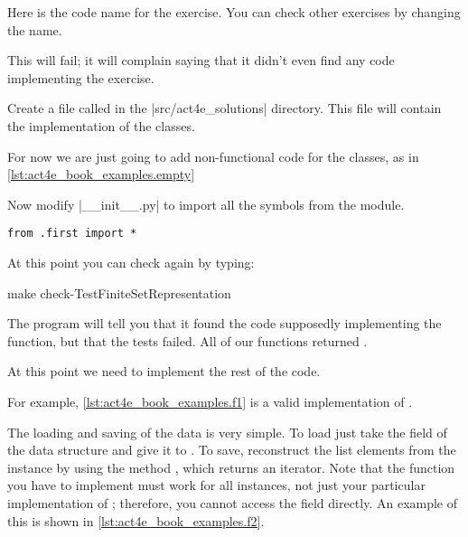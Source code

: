 Here  is the code name for the exercise. You can check other exercises by changing the name.

This will fail; it will complain saying that it didn't even find any code implementing the exercise.


Create a file called  in the \files|src/act4e_solutions| directory.
This file will contain the implementation of the classes.

For now we are just going to add non-functional code for the classes,
as in \cref{lst:act4e_book_examples.empty}

\begin{longcode}
\caption{}
\label{lst:act4e_book_examples.empty}
\end{longcode}

Now modify \files|__init__.py| to import all the symbols from the  module.

\begin{verbatim}
from .first import *
\end{verbatim}

At this point you can check again by typing:

\begin{console}
 make check-TestFiniteSetRepresentation
\end{console}

The program will tell you that it found the code supposedly implementing the function,
but that the tests failed. All of our functions returned .

At this point we need to implement the rest of the code.

For example, \cref{lst:act4e_book_examples.f1} is a valid implementation of \FiniteSet.

\begin{longcode}
\caption{}
\label{lst:act4e_book_examples.f1}
\end{longcode}

The loading and saving of the data is very simple.
To load just take the  field of the data structure and give it to .
To save, reconstruct the list elements from the  instance by using the method , which returns an iterator.
Note that the  function you have to implement must work for all \FiniteSet instances, not just your particular implementation of \FiniteSet; therefore, you cannot access the  field directly.
An example of this is shown in \cref{lst:act4e_book_examples.f2}.

